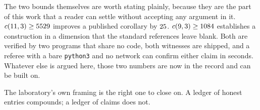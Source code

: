 \documentclass[journal]{IEEEtran}
\begin{document}
The two bounds themselves are worth stating plainly, because they are the
part of this work that a reader can settle without accepting any argument
in it. $c(11,3) \ge 5529$ improves a published corollary by
$25$. $c(9,3) \ge 1084$ establishes a construction
in a dimension that the standard references leave blank. Both are verified
by two programs that share no code, both witnesses are shipped, and a
referee with a bare \texttt{python3} and no network can confirm either
claim in seconds. Whatever else is argued here, those two numbers are now
in the record and can be built on.

The laboratory's own framing is the right one to close on. A ledger of
honest entries compounds; a ledger of claims does not.

\clearpage


\end{document}
